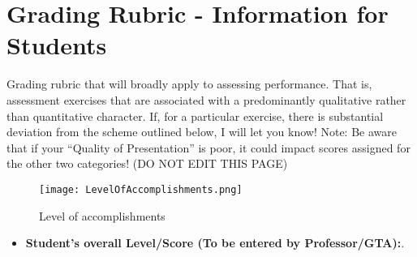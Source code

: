 %
\section*{Grading Rubric - Information for Students}

Grading rubric that will broadly apply to assessing performance. That is, assessment exercises that are associated with a predominantly qualitative rather than quantitative character. If, for a particular exercise, there is substantial deviation from the scheme outlined below, I will let you know! Note: Be aware that if your “Quality of Presentation” is poor, it could impact scores assigned for the other two categories! (DO NOT EDIT THIS PAGE)
\begin{figure}[ht!]
    \centering
    \texttt{[image: LevelOfAccomplishments.png]}
    \caption{Level of accomplishments}
    \label{fig:Level of accomplishments}
\end{figure}

\begin{itemize}
    \item \textbf{Student's overall Level/Score (To be entered by Professor/GTA):}.
\end{itemize}



